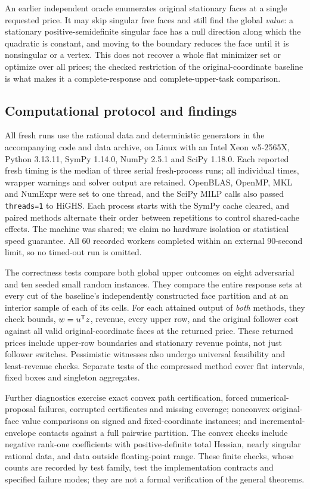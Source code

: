 An earlier independent oracle enumerates original stationary faces at a
single requested price. It may skip singular free faces and still find the
global \emph{value}: a stationary positive-semidefinite singular face has a
null direction along which the quadratic is constant, and moving to the
boundary reduces the face until it is nonsingular or a vertex. This does not
recover a whole flat minimizer set or optimize over all prices; the checked
restriction of the original-coordinate baseline is what makes it a
complete-response and complete-upper-task comparison.

\subsection{Computational protocol and findings}\label{subsec:computations}
All fresh runs use the rational data and deterministic generators in the
accompanying code and data archive, on Linux with an Intel Xeon w5-2565X,
Python 3.13.11, SymPy 1.14.0, NumPy 2.5.1 and SciPy 1.18.0. Each reported
fresh timing is the median of three serial fresh-process runs; all individual
times, wrapper warnings and solver output are retained. OpenBLAS, OpenMP, MKL
and NumExpr were set to one thread, and the SciPy MILP calls also passed
\texttt{threads=1} to HiGHS. Each process starts with the SymPy cache cleared,
and paired methods alternate their order between repetitions to control
shared-cache effects. The machine was shared; we claim no hardware isolation or
statistical speed guarantee. All 60 recorded workers completed within an
external 90-second limit, so no timed-out run is omitted.

The correctness tests compare both global upper outcomes on eight adversarial
and ten seeded small random instances. They compare the entire response sets at
every cut of the baseline's independently constructed face partition and at
an interior sample of each of its cells. For each attained output of \emph{both} methods, they
check bounds, $w=u^{\mathsf T} z$, revenue, every upper row, and the original
follower cost against all valid original-coordinate faces at the returned
price. These returned prices include upper-row boundaries and stationary
revenue points, not just follower switches. Pessimistic witnesses also undergo universal
feasibility and least-revenue checks. Separate tests of the compressed method
cover flat intervals, fixed boxes and singleton aggregates.

Further diagnostics exercise exact convex path certification, forced
numerical-proposal failures, corrupted certificates and missing coverage;
nonconvex original-face value comparisons on signed and fixed-coordinate
instances; and incremental-envelope contacts against a full pairwise partition.
The convex checks include negative rank-one coefficients with positive-definite
total Hessian, nearly singular rational data, and data outside floating-point
range. These finite checks, whose counts are recorded by test family, test
the implementation contracts and specified failure modes; they are not a
formal verification of the general theorems.

